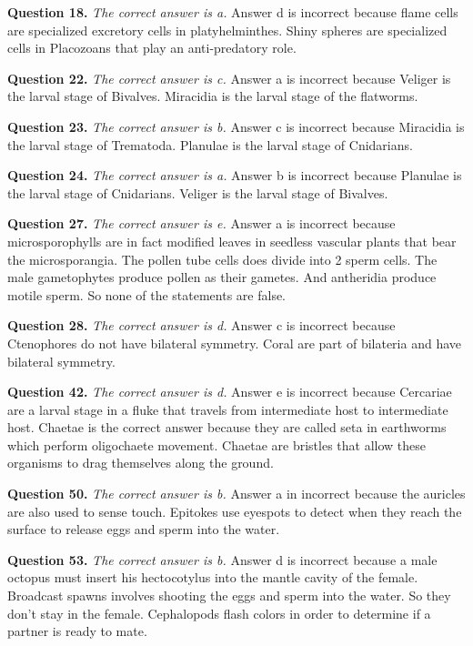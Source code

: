 \documentclass{article}
\begin{document}
\textbf{Question 18.} \textit{The correct answer is a.} Answer d is incorrect
because flame cells are specialized excretory cells in platyhelminthes. Shiny
spheres are specialized cells in Placozoans that play an anti-predatory role.

\textbf{Question 22.} \textit{The correct answer is c.} Answer a is incorrect
because Veliger is the larval stage of Bivalves. Miracidia is the larval stage
of the flatworms.

\textbf{Question 23.} \textit{The correct answer is b.} Answer c is incorrect
because Miracidia is the larval stage of Trematoda. Planulae is the larval stage
of Cnidarians.

\textbf{Question 24.} \textit{The correct answer is a.} Answer b is incorrect
because Planulae is the larval stage of Cnidarians. Veliger is the larval stage
of Bivalves.

\textbf{Question 27.} \textit{The correct answer is e.} Answer a is incorrect
because microsporophylls are in fact modified leaves in seedless vascular plants
that bear the microsporangia. The pollen tube cells does divide into 2 sperm
cells. The male gametophytes produce pollen as their gametes. And antheridia
produce motile sperm. So none of the statements are false.

\textbf{Question 28.} \textit{The correct answer is d.} Answer c is incorrect
because Ctenophores do not have bilateral symmetry. Coral are part of bilateria
and have bilateral symmetry.

\textbf{Question 42.} \textit{The correct answer is d.} Answer e is incorrect
because Cercariae are a larval stage in a fluke that travels from intermediate
host to intermediate host. Chaetae is the correct answer because they are called
seta in earthworms which perform oligochaete movement. Chaetae are bristles that
allow these organisms to drag themselves along the ground.

\textbf{Question 50.} \textit{The correct answer is b.} Answer a in incorrect
because the auricles are also used to sense touch. Epitokes use eyespots to
detect when they reach the surface to release eggs and sperm into the water.

\textbf{Question 53.} \textit{The correct answer is b.} Answer d is incorrect
because a male octopus must insert his hectocotylus into the mantle cavity of
the female. Broadcast spawns involves shooting the eggs and sperm into the
water. So they don't stay in the female. Cephalopods flash colors in order to
determine if a partner is ready to mate.
\end{document}
